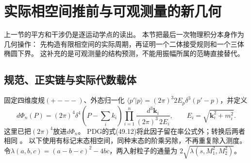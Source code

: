 \documentclass[11pt,a4paper]{ctexart}
\theoremstyle{cnplain}\newtheorem{theorem}{定理}[section]
\theoremstyle{definition}\newtheorem{definition}[theorem]{定义}
\theoremstyle{remark}\newtheorem{remark}[theorem]{注}
\begin{document}
\section{实际相空间推前与可观测量的新几何}\label{sec:phasepush}
上一节的平方和干涉仍是逐运动学点的读出。
本节把最后一次物理积分本身作为几何操作：
先构造有限相空间的实际周期，再证明一个二体接受规则和一个三体椭圆下界。
这补充的是可观测量的结构预测，不能用振幅所属的范畴直接替代。

\subsection{规范、正实链与实际代数载体}
固定四维度规$(+---)$、外态归一化
$\langle p'|p\rangle=(2\pi)^3 2E_p\delta^3(p'-p)$，并定义
\begin{equation}\label{eq:physicalphin}
 d\Phi_n(P)=(2\pi)^4\delta^4(P-\textstyle\sum_i k_i)
       \prod_{i=1}^n\frac{d^3\mathbf k_i}{(2\pi)^3\,2E_i},
 \qquad E_i=\sqrt{\mathbf k_i^2+m_i^2}.
\end{equation}
这里已把$(2\pi)^4$放进$d\Phi_n$。
PDG的式(49.12)将此因子留在率公式外；转换后两者相同
\cite[式(49.8)--(49.13)]{PDGphase}。
以下使用有标记末态相空间，同种末态的阶乘另除，不再重复除入测度。
令$\lambda(a,b,c)=(a-b-c)^2-4bc$，两入射粒子的通量为
$2\sqrt{\lambda(s,M_1^2,M_2^2)}$。
\end{document}
